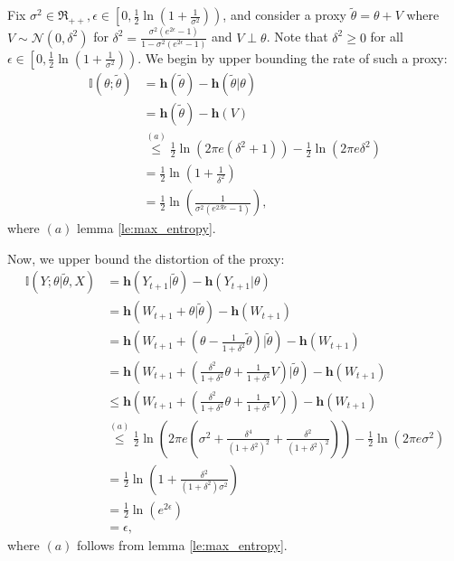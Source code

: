 \documentclass[twoside,11pt]{article}
\renewenvironment{proof}{\par\noindent{\bf Proof\ }}{\hfill\BlackBox\\[2mm]}
\newenvironment{proof}{\par\noindent{\bf Proof\ }}{\hfill\BlackBox\\[2mm]}
\def\regret{\mathcal{R}}
\def\diffentropy{\bf h}
\def\proxytheta{\tilde{\theta}}
\def\diffentropy{\mathbf{h}}
\def\I{\mathbb{I}}
\begin{document}
\begin{proof}
    Fix $\sigma^2 \in \Re_{++}, \epsilon\in \left[0, \frac{1}{2}\ln\left(1 + \frac{1}{\sigma^2}\right)\right)$, and consider a proxy $\proxytheta = \theta + V$ where $V\sim \mathcal{N}(0, \delta^2)$ for $\delta^2 = \frac{\sigma^2(e^{2\epsilon}-1)}{1 - \sigma^2(e^{2\epsilon}-1)}$ and $V \perp \theta$. Note that $\delta^2 \geq 0$ for all $\epsilon\in\left[0, \frac{1}{2}\ln\left(1 + \frac{1}{\sigma^2}\right)\right)$. We begin by upper bounding the rate of such a proxy:
    \begin{align*}
        \I(\theta;\proxytheta)
        & = \diffentropy(\proxytheta) - \diffentropy(\proxytheta|\theta)\\
        & = \diffentropy(\proxytheta) - \diffentropy(V)\\
        & \overset{(a)}{\leq} \frac{1}{2}\ln\left(2\pi e \left(\delta^2 + 1\right)\right) - \frac{1}{2}\ln\left(2\pi e \delta^2\right)\\
        & = \frac{1}{2}\ln\left(1 + \frac{1}{\delta^2}\right)\\
        & = \frac{1}{2}\ln\left(\frac{1}{\sigma^2\left(e^{2\regret\epsilon}-1\right)}\right),
    \end{align*}
    where $(a)$ lemma \ref{le:max_entropy}.\newline
    
    Now, we upper bound the distortion of the proxy:
        \begin{align*}
            \I(Y;\theta|\proxytheta, X)
            & = \diffentropy(Y_{t+1}|\proxytheta) - \diffentropy(Y_{t+1}|\theta)\\
            & = \diffentropy(W_{t+1} + \theta|\proxytheta) - \diffentropy(W_{t+1})\\
            & = \diffentropy\left(W_{t+1} + \left(\theta - \frac{1}{1+\delta^2}\proxytheta\right)\Big|\proxytheta\right) - \diffentropy(W_{t+1})\\
            & = \diffentropy\left(W_{t+1} + \left(\frac{\delta^2}{1+\delta^2}\theta + \frac{1}{1+\delta^2}V\right) \Big| \proxytheta\right) - \diffentropy(W_{t+1})\\
            & \leq \diffentropy\left(W_{t+1} + \left(\frac{\delta^2}{1+\delta^2}\theta + \frac{1}{1+\delta^2}V\right)\right) - \diffentropy(W_{t+1})\\
            & \overset{(a)}{\leq} \frac{1}{2}\ln\left(2\pi e\left(\sigma^2 + \frac{\delta^4}{(1 + \delta^2)^2} + \frac{\delta^2}{(1 + \delta^2)^2}\right)\right) - \frac{1}{2}\ln\left(2\pi e \sigma^2\right)\\
            & = \frac{1}{2}\ln\left(1 + \frac{\delta^2}{(1 + \delta^2)\sigma^2}\right)\\
            & = \frac{1}{2}\ln\left(e^{2\epsilon}\right)\\
            & = \epsilon,
        \end{align*}
    where $(a)$ follows from lemma \ref{le:max_entropy}.\newline
        

\end{proof}
\end{document}
